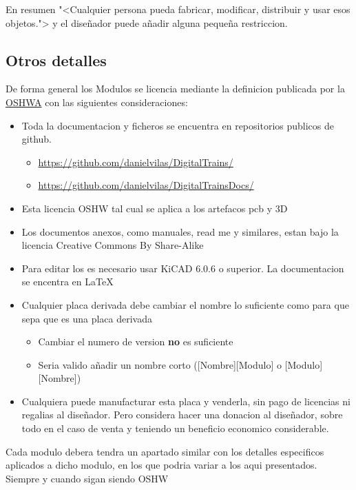 En resumen "<Cualquier persona pueda fabricar, modificar, distribuir y usar esos objetos."> y el diseñador 
puede añadir alguna pequeña restriccion.

\subsection{Otros detalles}
De forma general los Modulos se licencia mediante la definicion publicada por la \href{https://www.oshwa.org/definition/spanish/}{OSHWA}
con las siguientes consideraciones:
\begin{itemize}
    \item Toda la documentacion y ficheros se encuentra en repositorios publicos de github.
    \begin{itemize}
        \item \url{https://github.com/danielvilas/DigitalTrains/}
        \item \url{https://github.com/danielvilas/DigitalTrainsDocs/} 
    \end{itemize}
    \item Esta licencia OSHW tal cual se aplica a los artefacos pcb y 3D 
    \item Los documentos anexos, como manuales, read me y similares, estan bajo la licencia Creative Commons By Share-Alike 
    \ccbysa
    \item Para editar los es necesario usar KiCAD 6.0.6 o superior. La documentacion se encentra en \LaTeX
    \item Cualquier placa derivada debe cambiar el nombre lo suficiente como para que sepa que es una placa derivada
    \begin{itemize}
        \item Cambiar el numero de version \textbf{no} es suficiente
        \item Seria valido añadir un nombre corto ([Nombre][Modulo] o [Modulo][Nombre]) 
    \end{itemize}
    \item Cualquiera puede manufacturar esta placa y venderla, sin pago de licencias ni regalias al diseñador.
Pero considera hacer una donacion al diseñador, sobre todo en el caso de venta y teniendo un beneficio economico
considerable.
\end{itemize}

Cada modulo debera tendra un apartado similar con los detalles especificos aplicados a dicho modulo, en los
que podria variar a los aqui presentados. Siempre y cuando sigan siendo OSHW
